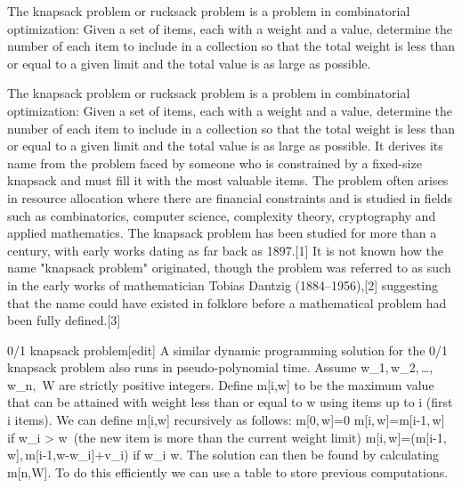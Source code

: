 The knapsack problem or rucksack problem is a problem in combinatorial optimization: Given a set of items, each with a weight and a value, determine the number of each item to include in a collection so that the total weight is less than or equal to a given limit and the total value is as large as possible.

The knapsack problem or rucksack problem is a problem in combinatorial optimization: Given a set of items, each with a weight and a value, determine the number of each item to include in a collection so that the total weight is less than or equal to a given limit and the total value is as large as possible. It derives its name from the problem faced by someone who is constrained by a fixed-size knapsack and must fill it with the most valuable items.
The problem often arises in resource allocation where there are financial constraints and is studied in fields such as combinatorics, computer science, complexity theory, cryptography and applied mathematics.
The knapsack problem has been studied for more than a century, with early works dating as far back as 1897.[1] It is not known how the name "knapsack problem" originated, though the problem was referred to as such in the early works of mathematician Tobias Dantzig (1884–1956),[2] suggesting that the name could have existed in folklore before a mathematical problem had been fully defined.[3]


0/1 knapsack problem[edit]
A similar dynamic programming solution for the 0/1 knapsack problem also runs in pseudo-polynomial time. Assume w_1,\,w_2,\,\ldots,\,w_n,\, W are strictly positive integers. Define m[i,w] to be the maximum value that can be attained with weight less than or equal to w using items up to i (first i items).
We can define m[i,w] recursively as follows:
m[0,\,w]=0
m[i,\,w]=m[i-1,\,w] if w_i > w\,\! (the new item is more than the current weight limit)
m[i,\,w]=\max(m[i-1,\,w],\,m[i-1,w-w_i]+v_i) if w_i \leqslant w.
The solution can then be found by calculating m[n,W]. To do this efficiently we can use a table to store previous computations.

